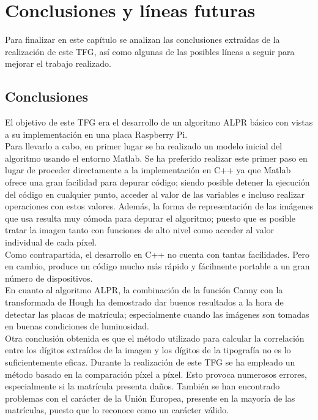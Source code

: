\chapter{Conclusiones y líneas futuras}
Para finalizar en este capítulo se analizan las conclusiones extraídas de la realización de este \ac{TFG}, así como algunas de las posibles líneas a seguir para mejorar el trabajo realizado.

\section{Conclusiones}
El objetivo de este \ac{TFG} era el desarrollo de un algoritmo \ac{ALPR} básico con vistas a su implementación en una placa Raspberry Pi.\\

Para llevarlo a cabo, en primer lugar se ha realizado un modelo inicial del algoritmo usando el entorno Matlab. Se ha preferido realizar este primer paso en lugar de proceder directamente a la implementación en C++ ya que Matlab ofrece una gran facilidad para depurar código; siendo posible detener la ejecución del código en cualquier punto, acceder al valor de las variables e incluso realizar operaciones con estos valores. Además, la forma de representación de las imágenes que usa resulta muy cómoda para depurar el algoritmo; puesto que es posible tratar la imagen tanto con funciones de alto nivel como acceder al valor individual de cada píxel.\\

Como contrapartida, el desarrollo en C++ no cuenta con tantas facilidades.  Pero en cambio, produce un código mucho más rápido y fácilmente portable a un gran número de dispositivos.\\

En cuanto al algoritmo \ac{ALPR}, la combinación de la función Canny con la transformada de Hough ha demostrado dar buenos resultados a la hora de detectar las placas de matrícula; especialmente cuando las imágenes son tomadas en buenas condiciones de luminosidad.\\

Otra conclusión obtenida es que el método utilizado para calcular la correlación entre los dígitos extraídos de  la imagen y los dígitos de la tipografía no es lo suficientemente eficaz. Durante la realización de este TFG se ha empleado un método basado en la comparación píxel a píxel. Esto provoca numerosos errores, especialmente si la matrícula presenta daños. También se han encontrado problemas con el carácter de la Unión Europea, presente en la mayoría de las matrículas, puesto que lo reconoce como un carácter válido.\\

